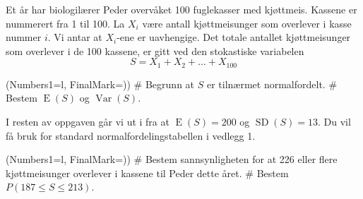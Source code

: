 Et år har biologilærer Peder overvåket 100 
fuglekasser med kjøttmeis. Kassene er nummerert fra 1 til
100. La $X_i$ være antall kjøttmeisunger som overlever i kasse
nummer $i$. Vi antar at $X_i$-ene er uavhengige. 
Det totale antallet kjøttmeisunger som overlever i de 100
kassene, er gitt ved den stokastiske variabelen
\begin{equation*}
	S = X_1 + X_2 + \dots + X_{100}
\end{equation*}

\begin{easylist}
	\ListProperties(Numbers1=l, FinalMark={)})
	# Begrunn at $S$ er tilnærmet normalfordelt.
	# Bestem $\operatorname{E}(S)$ og $\operatorname{Var}(S)$.
\end{easylist}

I resten av oppgaven går vi ut i fra at 
$\operatorname{E}(S) = 200$ og 
$\operatorname{SD}(S) = 13$.
Du vil få bruk for standard normalfordelingstabellen i vedlegg 1.

\begin{easylist}
	\ListProperties(Numbers1=l, FinalMark={)})
	# Bestem sannsynligheten for at 226 eller flere kjøttmeisunger
	overlever i kassene til Peder dette året.
	# Bestem $P(187 \leq S \leq 213)$.
\end{easylist}
\pagebreak
